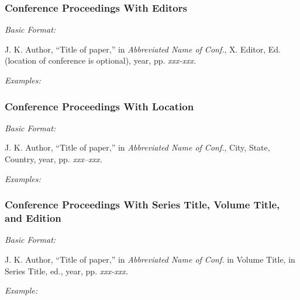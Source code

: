 \documentclass[10pt]{article}
\newcommand*{\guidelabel}[1]{\par\vspace{-4pt}\hspace*{22pt}\textit{#1}\par\vspace{-\parskip}}
\begin{document}
\subsubsection{Conference Proceedings With Editors}
\guidelabel{Basic Format:}
\begin{guideitems}
  \item J. K. Author, “Title of paper,” in \textit{Abbreviated Name of Conf.}, X. Editor, Ed. (location of conference is optional), year, pp. \textit{xxx-xxx.}
\end{guideitems}
\guidelabel{Examples:}
\begin{guideitems}
  \item {}
  \item {}
  \item {}
\end{guideitems}

\subsubsection{Conference Proceedings With Location}
\guidelabel{Basic Format:}
\begin{guideitems}
  \item J. K. Author, “Title of paper,” in \textit{Abbreviated Name of Conf.}, City, State, Country, year, pp. \textit{xxx–xxx.}
\end{guideitems}
\guidelabel{Examples:}
\begin{guideitems}
  \item {}
  \item {}
\end{guideitems}

\subsubsection{Conference Proceedings With Series Title, Volume Title, and Edition}
\guidelabel{Basic Format:}
\begin{guideitems}
  \item J. K. Author, “Title of paper,” in \textit{Abbreviated Name of Conf.} in Volume Title, in Series Title, ed., year, pp. \textit{xxx-xxx.}
\end{guideitems}
\guidelabel{Example:}
\begin{guideitems}
  \item {}
\end{guideitems}
\end{document}
